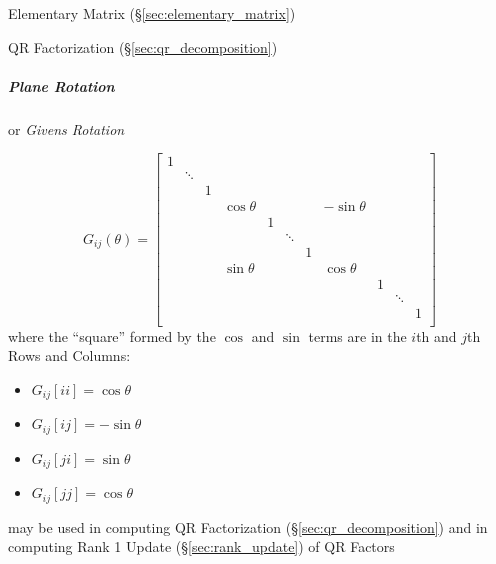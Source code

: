 Elementary Matrix (\S\ref{sec:elementary_matrix})

QR Factorization (\S\ref{sec:qr_decomposition})



\subparagraph{Plane Rotation}\label{sec:plane_rotation}\hfill

or \emph{Givens Rotation}

\[
  G_{ij}(\theta) = \begin{bmatrix}
    1 &        &   &            &   &        &   &             &   &        &   \\
      & \ddots &   &            &   &        &   &             &   &        &   \\
      &        & 1 &            &   &        &   &             &   &        &   \\
      &        &   & \cos\theta &   &        &   & -\sin\theta &   &        &   \\
      &        &   &            & 1 &        &   &             &   &        &   \\
      &        &   &            &   & \ddots &   &             &   &        &   \\
      &        &   &            &   &        & 1 &             &   &        &   \\
      &        &   & \sin\theta &   &        &   & \cos\theta  &   &        &   \\
      &        &   &            &   &        &   &             & 1 &        &   \\
      &        &   &            &   &        &   &             &   & \ddots &   \\
      &        &   &            &   &        &   &             &   &        & 1 \\
  \end{bmatrix}
\]
where the ``square'' formed by the $\cos$ and $\sin$ terms are in the $i$th and
$j$th Rows and Columns:
\begin{itemize}
  \item $G_{ij}[ii] = \cos\theta$
  \item $G_{ij}[ij] = -\sin\theta$
  \item $G_{ij}[ji] = \sin\theta$
  \item $G_{ij}[jj] = \cos\theta$
\end{itemize}

\fist may be used in computing QR Factorization (\S\ref{sec:qr_decomposition})
and in computing Rank 1 Update (\S\ref{sec:rank_update}) of QR Factors



